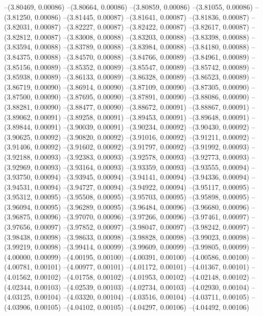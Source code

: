 --(3.80469, 0.00086)
--(3.80664, 0.00086)
--(3.80859, 0.00086)
--(3.81055, 0.00086)
--(3.81250, 0.00086)
--(3.81445, 0.00087)
--(3.81641, 0.00087)
--(3.81836, 0.00087)
--(3.82031, 0.00087)
--(3.82227, 0.00087)
--(3.82422, 0.00087)
--(3.82617, 0.00087)
--(3.82812, 0.00087)
--(3.83008, 0.00088)
--(3.83203, 0.00088)
--(3.83398, 0.00088)
--(3.83594, 0.00088)
--(3.83789, 0.00088)
--(3.83984, 0.00088)
--(3.84180, 0.00088)
--(3.84375, 0.00088)
--(3.84570, 0.00088)
--(3.84766, 0.00089)
--(3.84961, 0.00089)
--(3.85156, 0.00089)
--(3.85352, 0.00089)
--(3.85547, 0.00089)
--(3.85742, 0.00089)
--(3.85938, 0.00089)
--(3.86133, 0.00089)
--(3.86328, 0.00089)
--(3.86523, 0.00089)
--(3.86719, 0.00090)
--(3.86914, 0.00090)
--(3.87109, 0.00090)
--(3.87305, 0.00090)
--(3.87500, 0.00090)
--(3.87695, 0.00090)
--(3.87891, 0.00090)
--(3.88086, 0.00090)
--(3.88281, 0.00090)
--(3.88477, 0.00090)
--(3.88672, 0.00091)
--(3.88867, 0.00091)
--(3.89062, 0.00091)
--(3.89258, 0.00091)
--(3.89453, 0.00091)
--(3.89648, 0.00091)
--(3.89844, 0.00091)
--(3.90039, 0.00091)
--(3.90234, 0.00092)
--(3.90430, 0.00092)
--(3.90625, 0.00092)
--(3.90820, 0.00092)
--(3.91016, 0.00092)
--(3.91211, 0.00092)
--(3.91406, 0.00092)
--(3.91602, 0.00092)
--(3.91797, 0.00092)
--(3.91992, 0.00093)
--(3.92188, 0.00093)
--(3.92383, 0.00093)
--(3.92578, 0.00093)
--(3.92773, 0.00093)
--(3.92969, 0.00093)
--(3.93164, 0.00093)
--(3.93359, 0.00093)
--(3.93555, 0.00094)
--(3.93750, 0.00094)
--(3.93945, 0.00094)
--(3.94141, 0.00094)
--(3.94336, 0.00094)
--(3.94531, 0.00094)
--(3.94727, 0.00094)
--(3.94922, 0.00094)
--(3.95117, 0.00095)
--(3.95312, 0.00095)
--(3.95508, 0.00095)
--(3.95703, 0.00095)
--(3.95898, 0.00095)
--(3.96094, 0.00095)
--(3.96289, 0.00095)
--(3.96484, 0.00096)
--(3.96680, 0.00096)
--(3.96875, 0.00096)
--(3.97070, 0.00096)
--(3.97266, 0.00096)
--(3.97461, 0.00097)
--(3.97656, 0.00097)
--(3.97852, 0.00097)
--(3.98047, 0.00097)
--(3.98242, 0.00097)
--(3.98438, 0.00098)
--(3.98633, 0.00098)
--(3.98828, 0.00098)
--(3.99023, 0.00098)
--(3.99219, 0.00098)
--(3.99414, 0.00099)
--(3.99609, 0.00099)
--(3.99805, 0.00099)
--(4.00000, 0.00099)
--(4.00195, 0.00100)
--(4.00391, 0.00100)
--(4.00586, 0.00100)
--(4.00781, 0.00101)
--(4.00977, 0.00101)
--(4.01172, 0.00101)
--(4.01367, 0.00101)
--(4.01562, 0.00102)
--(4.01758, 0.00102)
--(4.01953, 0.00102)
--(4.02148, 0.00102)
--(4.02344, 0.00103)
--(4.02539, 0.00103)
--(4.02734, 0.00103)
--(4.02930, 0.00104)
--(4.03125, 0.00104)
--(4.03320, 0.00104)
--(4.03516, 0.00104)
--(4.03711, 0.00105)
--(4.03906, 0.00105)
--(4.04102, 0.00105)
--(4.04297, 0.00106)
--(4.04492, 0.00106)
